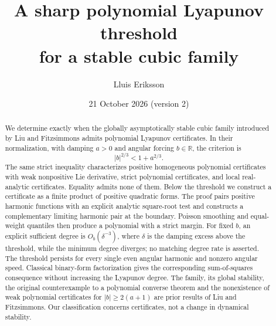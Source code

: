 \documentclass[11pt]{article}
\title{A sharp polynomial Lyapunov threshold\\for a stable cubic family}
\author{Lluis Eriksson}
\date{21 October 2026 (version 2)}
\theoremstyle{remark}\newtheorem{remark}[theorem]{Remark}
\newcommand{\R}{\mathbb R}
\begin{document}
\maketitle
\begin{abstract}
We determine exactly when the globally asymptotically stable cubic
family introduced by Liu and Fitzsimmons admits polynomial Lyapunov
certificates. In their normalization, with damping \(a>0\) and angular
forcing \(b\in\R\), the criterion is
\[
 |b|^{2/3}<1+a^{2/3}.
\]
The same strict inequality characterizes positive homogeneous
polynomial certificates with weak nonpositive Lie derivative, strict
polynomial certificates, and local real-analytic certificates.
Equality admits none of them. Below the threshold we construct a
certificate as a finite product of positive quadratic forms.
The proof pairs positive harmonic functions with an explicit analytic
square-root test and constructs a complementary limiting harmonic
pair at the boundary. Poisson smoothing and equal-weight quantiles
then produce a polynomial with a strict margin.
For fixed \(b\), an explicit sufficient degree is
\(O_b(\delta^{-3})\), where \(\delta\) is the damping excess above the
threshold, while
the minimum degree diverges; no matching degree rate is asserted.
The threshold persists for every single even angular harmonic and
nonzero angular speed. Classical binary-form factorization gives
the corresponding sum-of-squares consequence without increasing the
Lyapunov degree. The family, its global stability, the original
counterexample to a polynomial converse theorem and the nonexistence of
weak polynomial certificates for \(|b|\ge2(a+1)\) are prior results
of Liu and Fitzsimmons.
Our classification concerns certificates, not a change in dynamical
stability.
\end{abstract}
\end{document}
